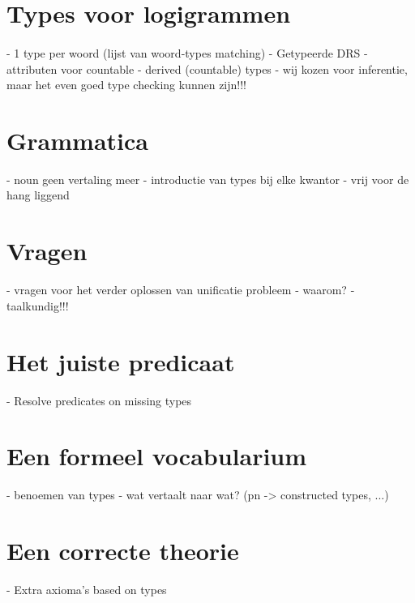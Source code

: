 \section{Types voor logigrammen}

\paragraph{}- 1 type per woord (lijst van woord-types matching)
- Getypeerde DRS
- attributen voor countable
- derived (countable) types
- wij kozen voor inferentie, maar het even goed type checking kunnen zijn!!!
\section{Grammatica}
- noun geen vertaling meer
- introductie van types bij elke kwantor
- vrij voor de hang liggend
\section{Vragen}
- vragen voor het verder oplossen van unificatie probleem
- waarom?
- taalkundig!!!
\section{Het juiste predicaat}
- Resolve predicates on missing types
\section{Een formeel vocabularium}
- benoemen van types
- wat vertaalt naar wat? (pn -> constructed types, ...)
\section{Een correcte theorie}
- Extra axioma's based on types
